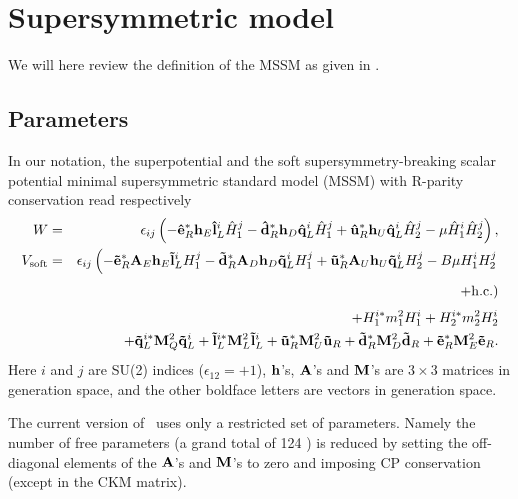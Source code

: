 \section{Supersymmetric model}

We will here review the definition of the MSSM as given in \cite{dspaper}.

\subsection{Parameters}

In our notation, the superpotential and the soft supersymmetry-breaking scalar
potential minimal supersymmetric standard model (MSSM) with R-parity
conservation \cite{mssm} read respectively
\begin{eqnarray}
  W &=& \epsilon_{ij} \left(
  - {\bf \hat{e}}_{R}^{*} {\bf h}_E {\bf \hat{l}}^i_{L} {\hat H}^j_1 
  - {\bf \hat{d}}_{R}^{*} {\bf h}_D {\bf \hat{q}}^i_{L} {\hat H}^j_1 
  + {\bf \hat{u}}_{R}^{*} {\bf h}_U {\bf \hat{q}}^i_{L} {\hat H}^j_2 
  - \mu {\hat H}^i_1 {\hat H}^j_2 
  \right),
\\
  V_{{\rm soft}} & = & 
  \epsilon_{ij} \left(
    -{\bf \tilde{e}}_{R}^{*} {\bf A}_E {\bf h}_E {\bf \tilde{l}}^i_{L} H^j_1 
  - {\bf \tilde{d}}_{R}^{*} {\bf A}_D {\bf h}_D {\bf \tilde{q}}^i_{L} H^j_1 
  + {\bf \tilde{u}}_{R}^{*} {\bf A}_U {\bf h}_U {\bf \tilde{q}}^i_{L} H^j_2
  - B \mu H^i_1 H^j_2 
  \right. \nonumber \\ && \phantom{\epsilon_{ij} \Bigl(} \left.
  + {\rm h.c.} 
  \right) \nonumber \\ &&
  + H^{i*}_1 m_1^2 H^i_1 + H^{i*}_2 m_2^2 H^i_2
  \nonumber \\ && +
  {\bf \tilde{q}}_{L}^{i*} {\bf M}_{Q}^{2} {\bf \tilde{q}}^i_{L} + 
  {\bf \tilde{l}}_{L}^{i*} {\bf M}_{L}^{2} {\bf \tilde{l}}^i_{L} + 
  {\bf \tilde{u}}_{R}^{*} {\bf M}_{U}^{2} {\bf \tilde{u}}_{R} + 
  {\bf \tilde{d}}_{R}^{*} {\bf M}_{D}^{2} {\bf \tilde{d}}_{R} + 
  {\bf \tilde{e}}_{R}^{*} {\bf M}_{E}^{2} {\bf \tilde{e}}_{R} .
\end{eqnarray}
Here $i$ and $j$ are SU(2) indices ($\epsilon_{12} = +1$), ${\bf h}$'s, ${\bf
  A}$'s and ${\bf M}$'s are $3\times3$ matrices in generation space,
and the other boldface letters are vectors in generation space.
  
The current version of \ds\ uses only a restricted set of parameters.
Namely the number of free parameters (a grand total of 124 \cite{dimopoulos95})
is reduced by setting the off-diagonal elements of the ${\bf A}$'s and ${\bf
  M}$'s to zero and imposing CP conservation (except in the CKM matrix). 

